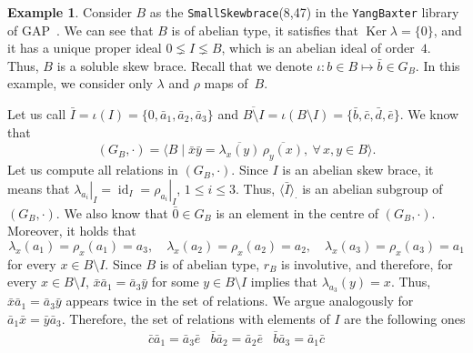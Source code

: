 \documentclass[12pt, a4paper, english]{article}
\theoremstyle{definition}
\newtheorem{exemple}[teorema]{Example}
\theoremstyle{remark}
\DeclareMathOperator{\Ker}{Ker}
\newcommand{\bigcdot}{\boldsymbol{\cdot}}
\begin{document}
\begin{exemple}
\label{ex:InoidG(X,r)}
Consider $B$ as the \texttt{SmallSkewbrace}(8,47) in the \texttt{YangBaxter} library of GAP~\cite{GAP4-15}. We can see that $B$ is of abelian type, it satisfies that $\Ker \lambda = \{0\}$, and it has a unique proper ideal $0 \lneq I \lneq B$, which is an abelian ideal of order~$4$. Thus, $B$ is a soluble skew brace. Recall that we denote $\iota \colon b \in B \mapsto \bar b\in G_B$. In this example, we consider only $\lambda$ and $\rho$ maps of~$B$.

Let us call $\bar I = \iota(I) = \{0,\bar a_1,\bar a_2,\bar a_3\}$ and $\overline{B \setminus I} = \iota(B \setminus I) = \{\bar b,\bar c,\bar d,\bar e\}$. We know that 
\[ (G_B,\cdot) = \langle B \mid \bar x \bar y = \overline{\lambda_x(y)}\,\overline{\rho_y(x)}, \ \forall\,x,y\in B\rangle.\]
Let us compute all relations in $(G_B,\cdot)$. Since $I$ is an abelian skew brace, it means that $\left.\lambda_{a_i}\right|_I = \operatorname{id}_I = \left.\rho_{a_i}\right|_I$, $1\leq i \leq 3$. Thus, $\langle \bar I \rangle_{\bigcdot}$ is an abelian subgroup of $(G_B,\cdot)$. We also know that $\bar 0 \in G_B$ is an element in the centre of $(G_B,\cdot)$. Moreover, it holds that
\[ \lambda_x(a_1) = \rho_x(a_1) = a_3, \quad \lambda_x(a_2) = \rho_x(a_2) = a_2,\quad  \lambda_x(a_3) = \rho_x(a_3) = a_1\]
for every $x \in B\setminus I$. Since $B$ is of abelian type, $r_B$ is involutive, and therefore, for every $x \in B \setminus I$, $\bar x\bar a_1 = \bar a_3 \bar y$ for some $y \in B\setminus I$ implies that $\lambda_{a_3}(y) = x$. Thus, $\bar x\bar a_1 = \bar a_3\bar y$ appears twice in the set of relations. We argue analogously for $\bar a_1\bar x = \bar y\bar a_3$. Therefore, the set of relations with elements of $I$ are the following ones
\begin{equation}
\label{eq:rel1}
\begin{array}{lll}
\bar c\bar a_1 = \bar a_3\bar e & \bar b\bar a_2 = \bar a_2\bar e & \bar b\bar a_3 = \bar a_1\bar c\\

\end{array}
\end{equation}
\end{exemple}
\end{document}
